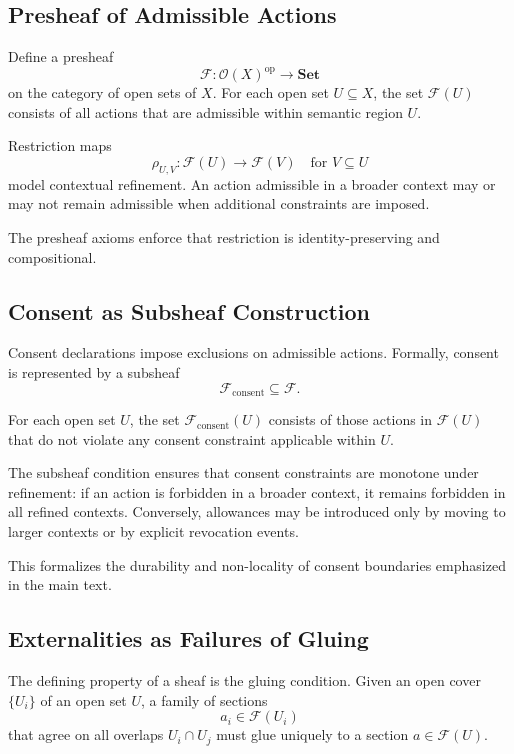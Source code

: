 \documentclass[11pt,oneside]{article}
\begin{document}
\subsection{Presheaf of Admissible Actions}

Define a presheaf
\[
\mathcal{F} : \mathcal{O}(X)^{\mathrm{op}} \to \mathbf{Set}
\]
on the category of open sets of \( X \). For each open set \( U \subseteq X \), the set \( \mathcal{F}(U) \) consists of all actions that are admissible within semantic region \( U \).

Restriction maps
\[
\rho_{U,V} : \mathcal{F}(U) \to \mathcal{F}(V)
\quad \text{for } V \subseteq U
\]
model contextual refinement. An action admissible in a broader context may or may not remain admissible when additional constraints are imposed.

The presheaf axioms enforce that restriction is identity-preserving and compositional.

\subsection{Consent as Subsheaf Construction}

Consent declarations impose exclusions on admissible actions. Formally, consent is represented by a subsheaf
\[
\mathcal{F}_{\mathrm{consent}} \subseteq \mathcal{F}.
\]

For each open set \( U \), the set \( \mathcal{F}_{\mathrm{consent}}(U) \) consists of those actions in \( \mathcal{F}(U) \) that do not violate any consent constraint applicable within \( U \).

The subsheaf condition ensures that consent constraints are monotone under refinement: if an action is forbidden in a broader context, it remains forbidden in all refined contexts. Conversely, allowances may be introduced only by moving to larger contexts or by explicit revocation events.

This formalizes the durability and non-locality of consent boundaries emphasized in the main text.

\subsection{Externalities as Failures of Gluing}

The defining property of a sheaf is the gluing condition. Given an open cover \( \{U_i\} \) of an open set \( U \), a family of sections
\[
a_i \in \mathcal{F}(U_i)
\]
that agree on all overlaps \( U_i \cap U_j \) must glue uniquely to a section \( a \in \mathcal{F}(U) \).
\end{document}
